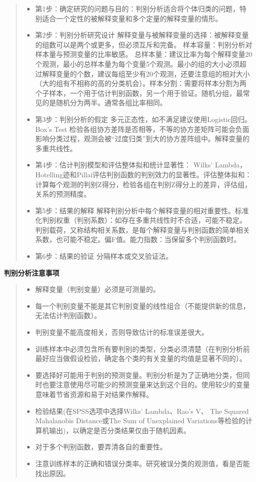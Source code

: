 \documentclass[]{ctexbook}
\providecommand{\tightlist}{%
  \setlength{\itemsep}{0pt}\setlength{\parskip}{0pt}}
\begin{document}
\begin{quote}
\begin{itemize}
\tightlist
\item
  第1步：确定研究的问题与目的：判别分析适合将个体归类的问题，特别适合一个定性的被解释变量和多个定量的解释变量的情形。
\item
  第2步：判别分析研究设计
  解释变量与被解释变量的选择：被解释变量的组数可以是两个或更多，但必须互斥和完备。
  样本容量：判别分析对样本量与预测变量的比率敏感。
  总样本量：建议比率为每个解释变量20个观测，最小的总样本量为每个变量5个观测。最小的组的大小必须超过解释变量的个数，建议每组至少有20个观测，还要注意组的相对大小（大的组有不相称的高的分类机会）。样本分割：需要将样本分割为两个子样本，一个用于估计判别函数，另一个用于验证。随机分组，最常见的是随机分为两半。通常各组比率相同。
\item
  第3步：判别分析的假定
  多元正态性，如不满足建议使用Logistic回归。Box's Test 检验各组协方差阵是否相等，不等的协方差矩阵可能会负面影响分类过程，观测会被``过度归类''到大的协方差阵组中。解释变量的多重共线性。
\item
  第4步：估计判别模型和评估整体拟和统计显著性：
  Wilks' Lambda， Hotelling迹和Pillai评估判别函数的判别效力的显著性。评估整体拟和：计算每个观测的判别Z得分，检验各组在判别Z得分上的差异，评估组，关系的预测精度。
\item
  第5步：结果的解释
  解释判别分析中每个解释变量的相对重要性。标准化判别权重（判别系数）：如存在多重共线性时不合适，可能不稳定。判别载荷，又称结构相关系数，是每个解释变量与判别函数的简单相关系数，也可能不稳定。偏F值。能力指数：当保留多个判别函数时。
\item
  第6步：结果的验证
  分隔样本或交叉验证法。
\end{itemize}
\end{quote}

\textbf{判别分析注意事项}

\begin{quote}
\begin{itemize}
\tightlist
\item
  解释变量（判别变量）必须是可测量的。
\item
  每一个判别变量不能是其它判别变量的线性组合（不能提供新的信息，无法估计判别函数）。
\item
  判别变量不能高度相关，否则导致估计的标准误差很大。
\item
  训练样本中必须包含所有要判别的类型，分类必须清楚（在判别分析前最好应当做假设检验，确定各个类的有关变量的均值是显著不同的）。
\item
  要选择好可能用于判别的预测变量。判别分析是为了正确地分类，但同时也要注意使用尽可能少的预测变量来达到这个目的。使用较少的变量意味着节省资源和易于对结果作解释。
\item
  检验结果(在SPSS选项中选择Wilks' Lambda、Rao's V、 The Squared Mahalanobis Distance或The Sum of Unexplained Variations等检验的计算机输出)，以确定是否分类结果仅由于随机因素。
\item
  对于多个判别函数，要弄清各自的重要性。
\item
  注意训练样本的正确和错误分类率。研究被误分类的观测值，看是否能找出原因。
\end{itemize}
\end{quote}
\end{document}
